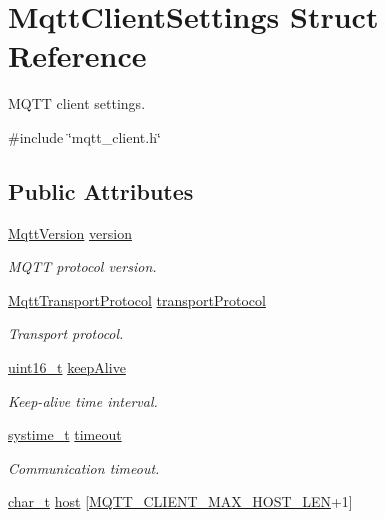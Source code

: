\hypertarget{structMqttClientSettings}{}\section{Mqtt\+Client\+Settings Struct Reference}
\label{structMqttClientSettings}


M\+Q\+TT client settings.  




{\ttfamily \#include \char`\"{}mqtt\+\_\+client.\+h\char`\"{}}

\subsection*{Public Attributes}
\begin{DoxyCompactItemize}
\item 
\hyperlink{mqtt__common_8h_ad475ca94d77bcab80ad53eb7b047ce57}{Mqtt\+Version} \hyperlink{structMqttClientSettings_a8f450260e9c4cecad29b2f32ed3650d9}{version}
\begin{DoxyCompactList}\small\item\em M\+Q\+TT protocol version. \end{DoxyCompactList}\item 
\hyperlink{mqtt__common_8h_ab192b1b856cff3c25110cdadf5debe0f}{Mqtt\+Transport\+Protocol} \hyperlink{structMqttClientSettings_a42da8ebd33216949919fcd6f1674adb1}{transport\+Protocol}
\begin{DoxyCompactList}\small\item\em Transport protocol. \end{DoxyCompactList}\item 
\hyperlink{stdint_8h_a273cf69d639a59973b6019625df33e30}{uint16\+\_\+t} \hyperlink{structMqttClientSettings_a102bcc25a927bd27d513307171aa0411}{keep\+Alive}
\begin{DoxyCompactList}\small\item\em Keep-\/alive time interval. \end{DoxyCompactList}\item 
\hyperlink{compiler__port_8h_ae3e32a98d431a02106616da3071832dd}{systime\+\_\+t} \hyperlink{structMqttClientSettings_a7ce9eacc362961f8cebe0cbeab800965}{timeout}
\begin{DoxyCompactList}\small\item\em Communication timeout. \end{DoxyCompactList}\item 
\hyperlink{compiler__port_8h_a40bb5262bf908c328fbcfbe5d29d0201}{char\+\_\+t} \hyperlink{structMqttClientSettings_a4aaa792316a8e2b6bd7edef2db37894c}{host} \mbox{[}\hyperlink{mqtt__client_8h_a2083c689d628c63ee0e4bd2850ce63d1}{M\+Q\+T\+T\+\_\+\+C\+L\+I\+E\+N\+T\+\_\+\+M\+A\+X\+\_\+\+H\+O\+S\+T\+\_\+\+L\+EN}+1\mbox{]}

\end{DoxyCompactItemize}
